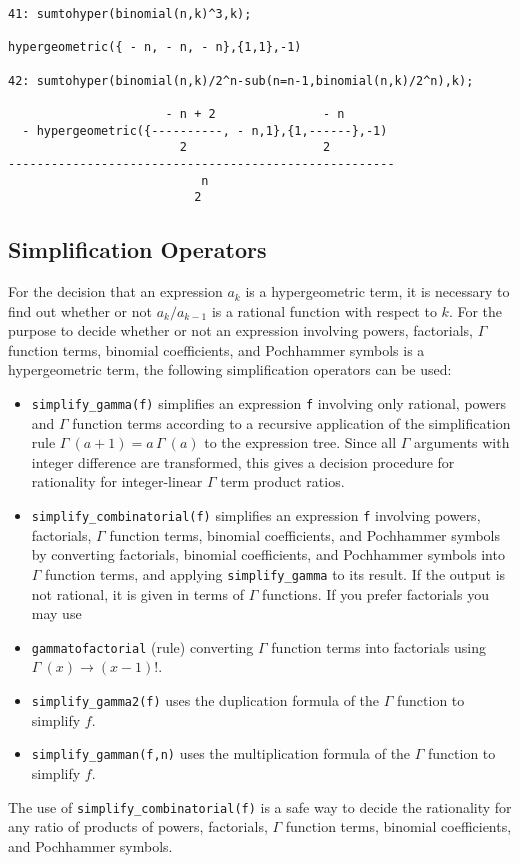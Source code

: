 {\small
\begin{verbatim}
41: sumtohyper(binomial(n,k)^3,k);

hypergeometric({ - n, - n, - n},{1,1},-1)

42: sumtohyper(binomial(n,k)/2^n-sub(n=n-1,binomial(n,k)/2^n),k);

                      - n + 2               - n
  - hypergeometric({----------, - n,1},{1,------},-1)
                        2                   2
------------------------------------------------------
                           n
                          2
\end{verbatim}
}\noindent


\subsection{Simplification Operators}

For the decision that an expression $a_k$ is a hypergeometric term, it is
necessary to find out whether or not $a_{k}/a_{k-1}$ is a rational
function with respect to $k$. For the purpose to decide
whether or not an expression involving powers, factorials,
$\Gamma$ function terms,
binomial coefficients, and Pochhammer symbols is a hypergeometric term,
the following simplification operators can be used:
\begin{itemize}
\item
{\tt simplify\_gamma(f)} simplifies an expression {\tt f} involving
only rational, powers and $\Gamma$ function terms according to a recursive
application of the simplification rule $\Gamma\:(a+1)=a\,\Gamma\:(a)$
to the expression tree. Since all $\Gamma$ arguments with integer difference
are transformed, this gives a decision procedure for rationality
for integer-linear $\Gamma$ term product ratios.
\item
{\tt simplify\_combinatorial(f)} simplifies an expression {\tt f}
involving powers, factorials, $\Gamma$ function terms,
binomial coefficients, and Pochhammer symbols by converting
factorials, binomial coefficients, and Poch\-hammer symbols into
$\Gamma$ function terms, and applying {\tt simplify\_gamma} to its
result. If the output is not rational,
it is given in terms of $\Gamma$ functions. If you prefer factorials
you may use
\item
{\tt gammatofactorial} (rule) converting $\Gamma$ function terms into
factorials using $\Gamma\:(x)\rightarrow (x-1)!$.
\item
{\tt simplify\_gamma2(f)}
uses the duplication formula of the $\Gamma$ function to simplify $f$.
\item
{\tt simplify\_gamman(f,n)}
uses the multiplication formula of the $\Gamma$ function to simplify $f$.
\end{itemize}
The use of {\tt simplify\_combinatorial(f)} is a safe way to
decide the rationality for any ratio of products of powers, factorials,
$\Gamma$ function terms, binomial coefficients, and Pochhammer symbols.

